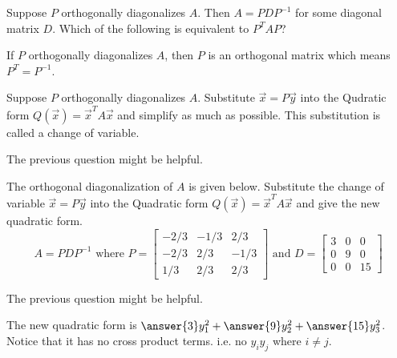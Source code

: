\documentclass{ximera}
\begin{document}
  	\begin{question} 
  Suppose $P$ orthogonally diagonalizes $A$. Then $A=PDP^{-1}$ for some diagonal matrix $D$. Which of the following is equivalent to $P^TAP$?
  		\begin{multipleChoice}
  		\end{multipleChoice}
  	  		\vspace{10pt}
  	\begin{hint} If $P$ orthogonally diagonalizes $A$, then $P$ is an orthogonal matrix which means $P^T=P^{-1}$.\end{hint}
  	\end{question}
  	\begin{question} 
  	Suppose $P$ orthogonally diagonalizes $A$.    Substitute $\vec{x} = P\vec{y}$ into the Qudratic form $Q(\vec{x}) = \vec{x}^TA\vec{x}$ and simplify as much as possible. This substitution is called a change of variable.
  		\begin{multipleChoice}
  			\choice{$P\vec{y}^TAP\vec{y}$}
  			\choice[correct]{$\vec{y}^TD\vec{y}$}
  			\choice{$P^T\vec{y}^TAP\vec{y}$}
  			\choice{$A\vec{y}$}
  				\choice{$D\vec{y}$}
  		\end{multipleChoice}
  		\vspace{10pt}
  		\begin{hint}
  			The previous question might be helpful.
  			\end{hint}
  		
  	\end{question}
  		 	\begin{question} 
 	  		 	 The orthogonal diagonalization of $A$ is given below.    Substitute the change of variable $\vec{x} = P\vec{y}$ into the Quadratic form $Q(\vec{x}) = \vec{x}^TA\vec{x}$ and give the new quadratic form. 
  	  		$$A = PDP^{-1} \text{  where  } P = \begin{bmatrix}  -2/3 &-1/3&2/3\\ -2/3&2/3&-1/3\\ 1/3& 2/3& 2/3\end{bmatrix} \text{  and  } D= \begin{bmatrix} 3&0&0\\0&9&0\\0&0&15\end{bmatrix}$$
  	  		 	\vspace{10pt}
  	  		 	\begin{hint}
  	  		 		The previous question might be helpful.
  	  		 	\end{hint}
  	  		 		\vspace{10pt}
  	  		 		
  	  		 	The new quadratic form is $ \answer{3}y_1^2    +\answer{9}y_2^2+\answer{15}y_3^2           $. Notice that it has no cross product terms. i.e. no $y_iy_j$ where $i\neq j$.
		 \end{question} 		                       %
  		                       
  	  		                       
  	  		                       
  	  		                       
  	  		                       
  	  		                       

  
\end{document}
